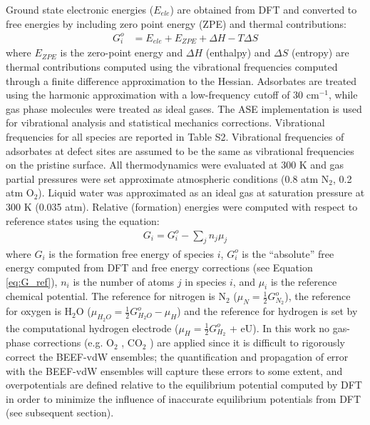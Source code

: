 \documentclass[journal=ascecg,manuscript=article,articletitle=true]{achemso}
\begin{document}
Ground state electronic energies ($E_{ele}$) are obtained from DFT and converted to free energies by including zero point energy (ZPE) and thermal contributions:
\begin{align}
	G_i^o &= E_{ele} + E_{ZPE} +  \Delta H - T \Delta S \label{eq:G_ref}
\end{align}
where $E_{ZPE}$ is the zero-point energy and $\Delta H$ (enthalpy) and $\Delta S$ (entropy) are thermal contributions computed using the vibrational frequencies computed through a finite difference approximation to the Hessian. Adsorbates are treated using the harmonic approximation with a low-frequency cutoff of 30 cm$^{-1}$, while gas phase molecules were treated as ideal gases. The ASE implementation \cite{ISI:000175131400009} is used for vibrational analysis and statistical mechanics corrections. Vibrational frequencies for all species are reported in Table S2. Vibrational frequencies of adsorbates at defect sites are assumed to be the same as vibrational frequencies on the pristine surface. All thermodynamics were evaluated at 300 K and gas partial pressures were set approximate atmospheric conditions (0.8 atm N$_2$, 0.2 atm O$_2$). Liquid water was approximated as an ideal gas at saturation pressure at 300 K (0.035 atm). Relative (formation) energies were computed with respect to reference states using the equation:
\begin{align}
	G_i = G_i^o - \sum_j n_j \mu_j\label{eq:G_sum}
\end{align}
where $G_i$ is the formation free energy of species $i$, $G_i^o$ is the ``absolute'' free energy computed from DFT and free energy corrections (see Equation \ref{eq:G_ref}), $n_i$ is the number of atoms $j$ in species $i$, and $\mu_i$ is the reference chemical potential. The reference for nitrogen is N$_2$ ($\mu_N = \frac{1}{2} G_{N_2}^o$), the reference for oxygen is H$_2$O ($\mu_{H_2O} = \frac{1}{2} G_{H_2O}^o - \mu_H$) and the reference for hydrogen is set by the computational hydrogen electrode ($\mu_H = \frac{1}{2} G_{H_2}^o$ + eU). In this work no gas-phase corrections (e.g. O$_2$ \cite{Norskov_2004}, CO$_2$ \cite{Peterson_2010}) are applied since it is difficult to rigorously correct the BEEF-vdW ensembles; the quantification and propagation of error with the BEEF-vdW ensembles will capture these errors to some extent, and overpotentials are defined relative to the equilibrium potential computed by DFT in order to minimize the influence of inaccurate equilibrium potentials from DFT (see subsequent section).
\end{document}
